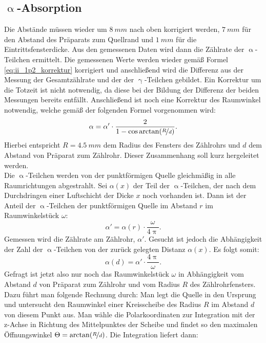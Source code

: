 \subsection{\texorpdfstring{$\upalpha$}{Alpha}-Absorption}
Die Abstände müssen wieder um $\SI{8}{mm}$ nach oben korrigiert werden, $\SI{7}{mm}$ für den Abstand des Präparats zum Quellrand und $\SI{1}{mm}$ für die Eintrittsfensterdicke. Aus den gemessenen Daten wird dann die Zählrate der $\upalpha$-Teilchen ermittelt. Die gemessenen Werte werden wieder gemäß Formel \eqref{eq:ii_1p2_korrektur} korrigiert und anschließend wird die Differenz aus der Messung der Gesamtzählrate und der der $\upgamma$-Teilchen gebildet. Ein Korrektur um die Totzeit ist nicht notwendig, da diese bei der Bildung der Differenz der beiden Messungen bereits entfällt. Anschließend ist noch eine Korrektur des Raumwinkel notwendig, welche gemäß der folgenden Formel vorgenommen wird:
\begin{equation}
\alpha = \alpha' \cdot \frac{2}{1-\cos\arctan(\nicefrac{R}{d})}.\label{eq:ii_2_winkel}
\end{equation}
Hierbei entspricht $R = \SI{4,5}{mm}$ dem Radius des Fensters des Zählrohrs und $d$ dem Abstand von Präparat zum Zählrohr. Dieser Zusammenhang soll kurz hergeleitet werden.\\
Die $\upalpha$-Teilchen werden von der punktförmigen Quelle gleichmäßig in alle Raumrichtungen abgestrahlt. Sei $\alpha(x)$ der Teil der $\upalpha$-Teilchen, der nach dem Durchdringen einer Luftschicht der Dicke $x$ noch vorhanden ist. Dann ist der Anteil der $\upalpha$-Teilchen der punktförmigen Quelle im Abstand $r$ im Raumwinkelstück $\omega$:
\begin{equation}
\alpha' = \alpha(r) \cdot \frac{\omega}{4 \uppi}.\label{eq:ii_2_abh}
\end{equation}
Gemessen wird die Zählrate am Zählrohr, $\alpha'$. Gesucht ist jedoch die Abhängigkeit der Zahl der $\upalpha$-Teilchen von der zurück gelegten Distanz $\alpha(x)$. Es folgt somit:
\begin{equation}
\alpha(d) = \alpha' \cdot \frac{4\uppi}{\omega}.
\end{equation}
Gefragt ist jetzt also nur noch das Raumwinkelstück $\omega$ in Abhängigkeit vom Abstand $d$ von Präparat zum Zählrohr und vom Radius $R$ des Zählrohrfensters.\\
Dazu führt man folgende Rechnung durch: Man legt die Quelle in den Ursprung und untersucht den Raumwinkel einer Kreisscheibe des Radius $R$ im Abstand $d$ von diesem Punkt aus. Man wähle die Polarkoordinaten zur Integration mit der z-Achse in Richtung des Mittelpunktes der Scheibe und findet so den maximalen Öffnungswinkel $\Theta = \arctan(\nicefrac{R}{d})$. Die Integration liefert dann:
